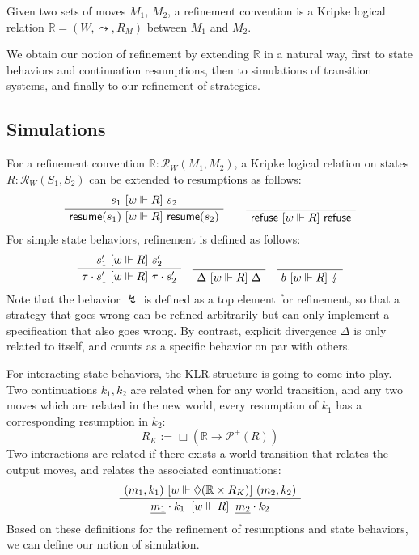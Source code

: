 \begin{definition}
Given two sets of moves $M_1$, $M_2$,
a refinement convention
is a Kripke logical relation $\mathbb{R} = (W, \leadsto, R_M)$
between $M_1$ and $M_2$.
\end{definition}

We obtain our notion of refinement by extending $\mathbb{R}$
in a natural way,
first to state behaviors and continuation resumptions,
then to simulations of transition systems,
and finally to our refinement of strategies.

\subsection{Simulations}

For a refinement convention $\mathbb{R} : \mathcal{R}_W(M_1, M_2)$,
a Kripke logical relation on states $R : \mathcal{R}_W(S_1, S_2)$
can be extended to resumptions as follows:
\[
  \AxiomC{$s_1 \ifr{w \Vdash R} s_2$}
  \UnaryInfC{$\kw{resume}(s_1) \ifr{w \Vdash R} \kw{resume}(s_2)$}
  \DisplayProof
  \qquad
  \AxiomC{\rule{0pt}{\baselineskip}}
  \UnaryInfC{$\kw{refuse} \ifr{w \Vdash R} \kw{refuse}$}
  \DisplayProof
\]
For simple state behaviors,
refinement is defined as follows:
\[
  \AxiomC{$s_1' \ifr{w \Vdash R} s_2'$}
  \UnaryInfC{$\tau \cdot s_1' \ifr{w \Vdash R} \tau \cdot s_2'$}
  \DisplayProof
  \quad
  \AxiomC{\rule{0pt}{\baselineskip}}
  \UnaryInfC{$\Delta \ifr{w \Vdash R} \Delta$}
  \DisplayProof
  \quad
  \AxiomC{\rule{0pt}{\baselineskip}}
  \UnaryInfC{$b \ifr{w \Vdash R} \lightning$}
  \DisplayProof
\]
Note that the behavior $\lightning$ is defined as a top element
for refinement,
so that a strategy that goes wrong can be refined arbitrarily
but can only implement a specification that
also goes wrong.
By contrast,
explicit divergence $\Delta$
is only related to itself,
and counts as a specific behavior on par with others.

For interacting state behaviors,
the KLR structure is going to come into play.
Two continuations $k_1, k_2$ are related when
for any world transition,
and any two moves which are related in the new world,
every resumption of $k_1$ has a corresponding resumption in $k_2$:
\[
  R_K := \Box (\mathbb{R} \rightarrow \mathcal{P}^+(R))
\]
Two interactions are related
if there exists a world transition that relates the output moves,
and relates the associated continuations:
\[
  \AxiomC{$(m_1, k_1) \ifr{w \Vdash \Diamond (\mathbb{R} \times R_K)} (m_2, k_2)$}
  \UnaryInfC{$
	{\underline{m_1} \cdot k_1}
	\: \ifr{w \Vdash R} \:
	{\underline{m_2} \cdot k_2}$}
  \DisplayProof
\]
Based on these definitions for the refinement of
resumptions and state behaviors,
we can define our notion of simulation.

